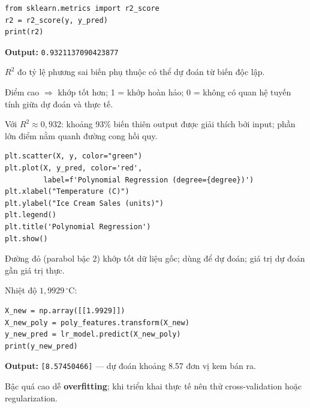 \begin{vidu}[title={Bước 4: Đánh giá hiệu năng --- $R^2$}]
\begin{lstlisting}
from sklearn.metrics import r2_score
r2 = r2_score(y, y_pred)
print(r2)
\end{lstlisting}

\textbf{Output:} \texttt{0.9321137090423877}

\begin{ynghia}[title={Giải thích $R^2$}]
$R^2$ đo tỷ lệ phương sai biến phụ thuộc có thể dự đoán từ biến độc lập.

Điểm cao $\Rightarrow$ khớp tốt hơn; 1 = khớp hoàn hảo; 0 = không có quan hệ tuyến tính giữa dự đoán và thực tế.

Với $R^2 \approx 0{,}932$: khoảng 93\% biến thiên output được giải thích bởi input; phần lớn điểm nằm quanh đường cong hồi quy.
\end{ynghia}
\end{vidu}

\begin{vidu}[title={Bước 5: Trực quan kết quả hồi quy đa thức}]
\begin{lstlisting}
plt.scatter(X, y, color="green")
plt.plot(X, y_pred, color='red',
         label=f'Polynomial Regression (degree={degree})')
plt.xlabel("Temperature (C)")
plt.ylabel("Ice Cream Sales (units)")
plt.legend()
plt.title('Polynomial Regression')
plt.show()
\end{lstlisting}


\begin{ynghia}[title={Đọc biểu đồ}]
Đường đỏ (parabol bậc 2) khớp tốt dữ liệu gốc; dùng để dự đoán; giá trị dự đoán gần giá trị thực.
\end{ynghia}
\end{vidu}

\begin{vidu}[title={Bước 6: Dự đoán dữ liệu mới}]
Nhiệt độ $1{,}9929\,^{\circ}\mathrm{C}$:

\begin{lstlisting}
X_new = np.array([[1.9929]])
X_new_poly = poly_features.transform(X_new)
y_new_pred = lr_model.predict(X_new_poly)
print(y_new_pred)
\end{lstlisting}

\textbf{Output:} \texttt{[8.57450466]} --- dự đoán khoảng 8.57 đơn vị kem bán ra.
\end{vidu}

\begin{luuy}[title={Bậc đa thức và overfitting}]
Bậc quá cao dễ \textbf{overfitting}; khi triển khai thực tế nên thử cross-validation hoặc regularization.
\end{luuy}
